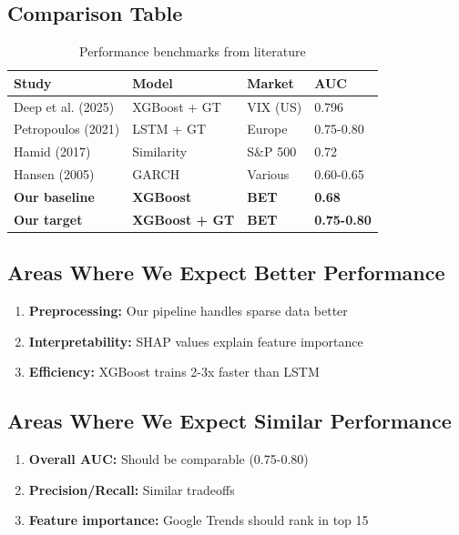 \documentclass[12pt,a4paper]{article}
\begin{document}
\subsection{Comparison Table}

\begin{table}[h]
\centering
\begin{tabular}{llll}
\hline
\textbf{Study} & \textbf{Model} & \textbf{Market} & \textbf{AUC} \\
\hline
Deep et al. (2025) & XGBoost + GT & VIX (US) & 0.796 \\
Petropoulos (2021) & LSTM + GT & Europe & 0.75-0.80 \\
Hamid (2017) & Similarity & S\&P 500 & 0.72 \\
Hansen (2005) & GARCH & Various & 0.60-0.65 \\
\hline
\textbf{Our baseline} & \textbf{XGBoost} & \textbf{BET} & \textbf{0.68} \\
\textbf{Our target} & \textbf{XGBoost + GT} & \textbf{BET} & \textbf{0.75-0.80} \\
\hline
\end{tabular}
\caption{Performance benchmarks from literature}
\end{table}

\subsection{Areas Where We Expect Better Performance}

\begin{enumerate}
    \item \textbf{Preprocessing:} Our pipeline handles sparse data better
    \item \textbf{Interpretability:} SHAP values explain feature importance
    \item \textbf{Efficiency:} XGBoost trains 2-3x faster than LSTM
\end{enumerate}

\subsection{Areas Where We Expect Similar Performance}

\begin{enumerate}
    \item \textbf{Overall AUC:} Should be comparable (0.75-0.80)
    \item \textbf{Precision/Recall:} Similar tradeoffs
    \item \textbf{Feature importance:} Google Trends should rank in top 15
\end{enumerate}
\end{document}
